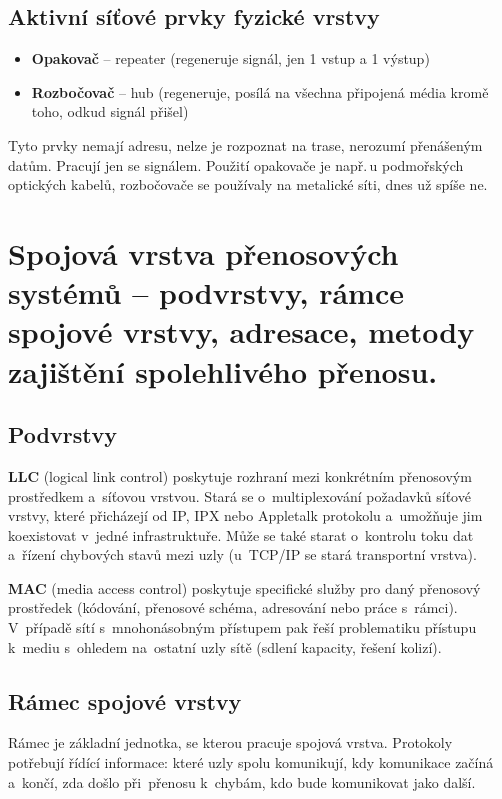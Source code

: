 \subsection{Aktivní síťové prvky fyzické vrstvy}
\begin{itemize}
    \item \textbf{Opakovač} -- repeater (regeneruje signál, jen 1 vstup a 1 výstup)
    \item \textbf{Rozbočovač} -- hub (regeneruje, posílá na všechna připojená média kromě toho, odkud signál přišel)
\end{itemize}
Tyto prvky nemají adresu, nelze je rozpoznat na trase, nerozumí přenášeným datům. Pracují jen se signálem. Použití opakovače je např.\,u podmořských optických kabelů, rozbočovače se používaly na metalické síti, dnes už spíše ne.

\clearpage
\section{Spojová vrstva přenosových systémů -- podvrstvy, rámce spojové vrstvy, adresace, metody zajištění spolehlivého přenosu.}

\subsection{Podvrstvy}

\textbf{LLC} (logical link control) poskytuje rozhraní mezi konkrétním přenosovým prostředkem a~síťovou vrstvou. Stará se o~multiplexování požadavků síťové vrstvy, které přicházejí od IP, IPX nebo Appletalk protokolu a~umožňuje jim koexistovat v~jedné infrastruktuře. Může se také starat o~kontrolu toku dat a~řízení chybových stavů mezi uzly (u~TCP/IP se stará transportní vrstva).

\textbf{MAC} (media access control) poskytuje specifické služby pro daný přenosový prostředek (kódování, přenosové schéma, adresování nebo práce s~rámci). V~případě sítí s~mnohonásobným přístupem pak řeší problematiku přístupu k~mediu s~ohledem na~ostatní uzly sítě (sdlení kapacity, řešení kolizí).

\subsection{Rámec spojové vrstvy}

Rámec je základní jednotka, se kterou pracuje spojová vrstva. Protokoly potřebují řídící informace: které uzly spolu komunikují, kdy komunikace začíná a~končí, zda došlo při~přenosu k~chybám, kdo bude komunikovat jako další.

